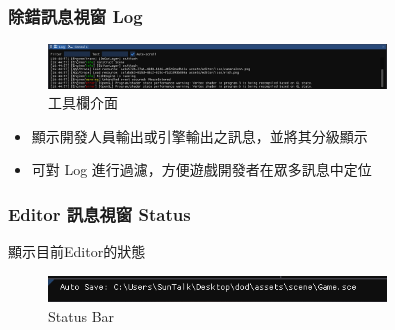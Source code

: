 

\subsubsection{除錯訊息視窗 Log}

\begin{figure}[h]
    \begin{center}
    \includegraphics[width=0.8\textwidth]{./resources/editor/logger.png}
    \end{center}
\caption{工具欄介面}
\end{figure}

\begin{itemize}
\item{顯示開發人員輸出或引擎輸出之訊息，並將其分級顯示}
\item{可對 Log 進行過濾，方便遊戲開發者在眾多訊息中定位}
\end{itemize}

\subsubsection{Editor 訊息視窗 Status}

顯示目前Editor的狀態

\begin{figure}[h]
    \begin{center}
        \includegraphics[width=0.8\textwidth]{./resources/editor/statusbar.png}
    \end{center}
\caption{Status Bar}
\end{figure}


